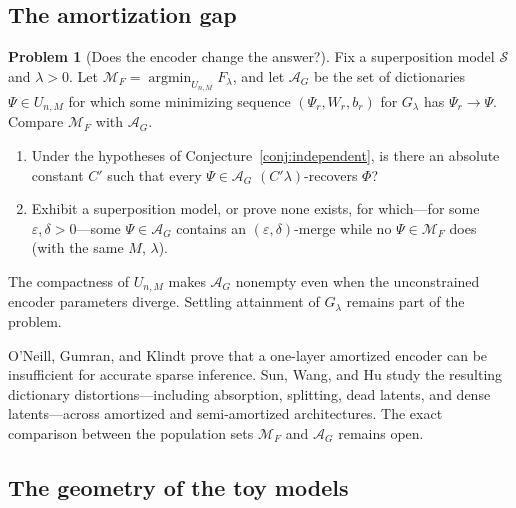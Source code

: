\documentclass[11pt]{amsart}
\theoremstyle{plain}
\theoremstyle{definition}
\newtheorem{problem}[theorem]{Problem}
\begin{document}
\subsection{The amortization gap}

\begin{problem}[Does the encoder change the answer?]\label{prob:amortization}
Fix a superposition model $\mathcal S$ and $\lambda>0$. Let $\mathcal M_F=\operatorname{argmin}_{U_{n,M}}F_\lambda$, and let $\mathcal A_G$ be the set of dictionaries $\Psi\in U_{n,M}$ for which some minimizing sequence $(\Psi_r,W_r,b_r)$ for $G_\lambda$ has $\Psi_r\to\Psi$. Compare $\mathcal M_F$ with $\mathcal A_G$.
\begin{enumerate}
\item Under the hypotheses of Conjecture~\ref{conj:independent}, is there an absolute constant $C'$ such that every $\Psi\in\mathcal A_G$ $(C'\lambda)$-recovers $\Phi$?
\item Exhibit a superposition model, or prove none exists, for which---for some $\varepsilon,\delta>0$---some $\Psi\in\mathcal A_G$ contains an $(\varepsilon,\delta)$-merge while no $\Psi\in\mathcal M_F$ does (with the same $M$, $\lambda$).
\end{enumerate}
The compactness of $U_{n,M}$ makes $\mathcal A_G$ nonempty even when the unconstrained encoder parameters diverge. Settling attainment of $G_\lambda$ remains part of the problem.
\end{problem}

O'Neill, Gumran, and Klindt \cite{oneill2024} prove that a one-layer amortized encoder can be insufficient for accurate sparse inference. Sun, Wang, and Hu \cite{sunwanghu2026} study the resulting dictionary distortions---including absorption, splitting, dead latents, and dense latents---across amortized and semi-amortized architectures. The exact comparison between the population sets $\mathcal M_F$ and $\mathcal A_G$ remains open.

\subsection{The geometry of the toy models}
\end{document}
